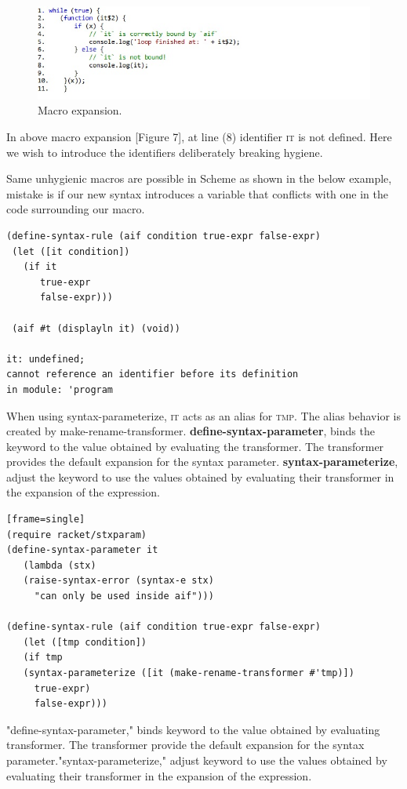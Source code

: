 \newpage
\begin{figure}

\centering
\includegraphics[width=1.0\textwidth]{images/macroexpansion.jpg}
\caption{Macro expansion.} 
\label{fig:macroexpansion}

\end{figure}

\newpage

In above macro expansion [Figure 7], at line (8) identifier \textsc{it} is not defined. Here we wish to introduce the identifiers deliberately breaking hygiene. 

Same unhygienic macros are possible in Scheme as shown in the below example, mistake is if our new syntax introduces a variable that conflicts with one in the code surrounding our macro.

\begin{lstlisting}[frame=single]
(define-syntax-rule (aif condition true-expr false-expr)
 (let ([it condition])
   (if it
      true-expr
      false-expr)))

 (aif #t (displayln it) (void))

it: undefined;
cannot reference an identifier before its definition
in module: 'program
\end{lstlisting}

When using syntax-parameterize, \textsc{it} acts as an alias for \textsc{tmp}. The alias behavior is created by make-rename-transformer. \textbf{define-syntax-parameter}, binds the keyword to the value obtained by evaluating the transformer. The transformer provides the default expansion for the syntax parameter. \textbf{syntax-parameterize}, adjust the keyword to use the values obtained by evaluating their transformer in the expansion of the expression. 

\begin{lstlisting}[frame=single][frame=single]
(require racket/stxparam)
(define-syntax-parameter it
   (lambda (stx)
   (raise-syntax-error (syntax-e stx)
     "can only be used inside aif")))

(define-syntax-rule (aif condition true-expr false-expr)
   (let ([tmp condition])
   (if tmp
   (syntax-parameterize ([it (make-rename-transformer #'tmp)])
     true-expr)
     false-expr)))
\end{lstlisting}
"define-syntax-parameter," binds keyword to the value obtained by evaluating transformer. The transformer provide the default expansion for the syntax parameter."syntax-parameterize," adjust keyword to use the values obtained by evaluating their transformer in the expansion of the expression. 
